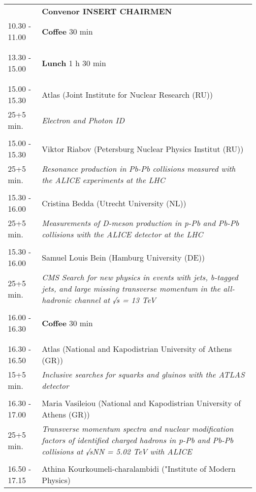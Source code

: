 \begin{longtable}{p{3cm}p{13cm}}
&\hfill {\bf Convenor INSERT CHAIRMEN }\\ 
10.30 - 11.00 & {\bf Coffee} \hfill 30 min \\ 
 & \\ 
 & \\ 
13.30 - 15.00 & {\bf Lunch} \hfill 1 h 30 min \\ 
 & \\ 
 & \\ 
15.00 - 15.30 & Atlas (Joint Institute for  Nuclear Research (RU))\\ 
25+5 min. & {\it Electron and Photon ID}\\ 
 & \\ 
15.00 - 15.30 & Viktor Riabov (Petersburg Nuclear Physics Institut (RU))\\ 
25+5 min. & {\it Resonance production in Pb-Pb collisions measured with the ALICE experiments at the LHC}\\ 
 & \\ 
15.30 - 16.00 & Cristina Bedda (Utrecht University (NL))\\ 
25+5 min. & {\it Measurements of D-meson production in p-Pb and Pb-Pb collisions with the ALICE detector at the LHC}\\ 
 & \\ 
15.30 - 16.00 & Samuel Louis Bein (Hamburg University (DE))\\ 
25+5 min. & {\it CMS Search for new physics in events with jets, b-tagged jets, and large missing transverse momentum in the all-hadronic channel at √s = 13 TeV}\\ 
 & \\ 
16.00 - 16.30 & {\bf Coffee} \hfill 30 min \\ 
 & \\ 
 & \\ 
16.30 - 16.50 & Atlas (National and Kapodistrian University of Athens (GR))\\ 
15+5 min. & {\it Inclusive searches for squarks and gluinos with the ATLAS detector}\\ 
 & \\ 
16.30 - 17.00 & Maria Vasileiou (National and Kapodistrian University of Athens (GR))\\ 
25+5 min. & {\it Transverse momentum spectra and nuclear modification factors of identified charged hadrons in p-Pb and Pb-Pb collisions at √sNN  = 5.02 TeV with ALICE}\\ 
 & \\ 
16.50 - 17.15 & Athina Kourkoumeli-charalambidi ("Institute of Modern Physics)\\ 

\end{longtable}
